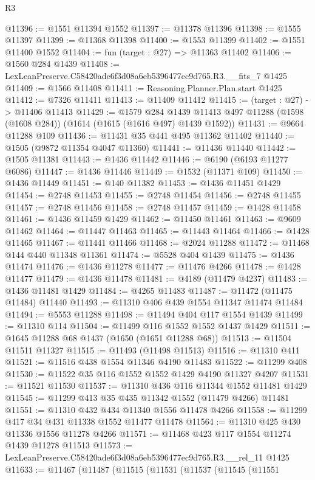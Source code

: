 \begin{lexlean}{R3}
\begin{coremodule}
@11396 := @1551 @11394 @1552
@11397 := @11378 @11396
@11398 := @1555 @11397
@11399 := @11368 @11398
@11400 := @1553 @11399
@11402 := @1551 @11400 @1552
@11404 := fun (target : @27) => @11363 @11402
@11406 := @1560 @284 @1439
@11408 := LexLeanPreserve.C58420ade6f3d08a6eb5396477ec9d765.R3.__fits_7 @1425
@11409 := @1566 @11408
@11411 := Reasoning.Planner.Plan.start @1425
@11412 := @7326 @11411
@11413 := @11409 @11412
@11415 := (target : @27) -> @11406 @11413
@11429 := @1579
    @284
    @1439
    @11413
    @497
    @11288
    (@1598 (@1608 @284))
    (@1614 (@1615 (@1616 @497) @1439 @1592))
@11431 := @9664 @11288 @109
@11436 := @11431 @35 @441 @495 @11362 @11402
@11440 := @1505 (@9872 @11354 @4047 @11360)
@11441 := @11436 @11440
@11442 := @1505 @11381
@11443 := @1436 @11442
@11446 := @6190 (@6193 @11277 @6086)
@11447 := @1436 @11446
@11449 := @1532 (@11371 @109)
@11450 := @1436 @11449
@11451 := @140 @11382
@11453 := @1436 @11451 @1429
@11454 := @2748 @11453
@11455 := @2748 @11454
@11456 := @2748 @11455
@11457 := @2748 @11456
@11458 := @2748 @11457
@11459 := @1428 @11458
@11461 := @1436 @11459 @1429
@11462 := @11450 @11461
@11463 := @9609 @11462
@11464 := @11447 @11463
@11465 := @11443 @11464
@11466 := @1428 @11465
@11467 := @11441 @11466
@11468 := @2024 @11288
@11472 := @11468 @144 @440 @11348 @11361
@11474 := @5528 @404 @1439
@11475 := @1436 @11474
@11476 := @1436 @11278
@11477 := @11476 @4266
@11478 := @1428 @11477
@11479 := @1436 @11478
@11481 := @4189 (@11479 @4237)
@11483 := @1436 @11481 @1429
@11484 := @4265 @11483
@11487 := @11472 (@11475 @11484) @11440
@11493 := @11310 @406 @439 @1554 @11347 @11474 @11484
@11494 := @5553 @11288
@11498 := @11494 @404 @117 @1554 @1439
@11499 := @11310 @114
@11504 := @11499 @116 @1552 @1552 @1437 @1429
@11511 := @1645 @11288 @68 @1437 (@1650 (@1651 @11288 @68))
@11513 := @11504 @11511 @11327
@11515 := @11493 (@11498 @11513)
@11516 := @11310 @411
@11521 := @11516 @438 @1554 @11346 @4190 @11483
@11522 := @11299 @408
@11530 := @11522 @35 @116 @1552 @1552 @1429 @4190 @11327 @4207
@11531 := @11521 @11530
@11537 := @11310 @436 @116 @11344 @1552 @11481 @1429
@11545 := @11299 @413 @35 @435 @11342 @1552 (@11479 @4266) @11481
@11551 := @11310 @432 @434 @11340 @1556 @11478 @4266
@11558 := @11299 @417 @34 @431 @11338 @1552 @11477 @11478
@11564 := @11310 @425 @430 @11336 @1556 @11278 @4266
@11571 := @11468 @423 @117 @1554 @11274 @1439 @11278 @11513
@11573 := LexLeanPreserve.C58420ade6f3d08a6eb5396477ec9d765.R3.__rel_11 @1425
@11633 := @11467
    (@11487
      (@11515
        (@11531
          (@11537
            (@11545
              (@11551

\end{coremodule}
\end{lexlean}
